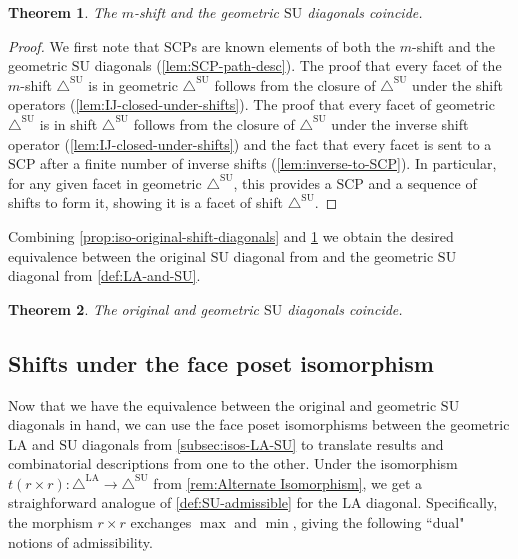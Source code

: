 \documentclass{amsart}
\newtheorem{theorem}{Theorem}[section]
\theoremstyle{definition}
\newcommand{\SU}{\mathrm{SU}}
\newcommand{\LA}{\mathrm{LA}}
\newcommand{\SUD}{\triangle^{\mathrm{SU}}}
\newcommand{\LAD}{\triangle^{\mathrm{LA}}}
\newcommand{\SCP}{\mathrm{SCP}}
\begin{document}
\begin{theorem} 
\label{prop:iso-shift-IJ-diagonals}
The $m$-shift and the geometric $\SU$ diagonals coincide.
\end{theorem}

\begin{proof}
We first note that $\SCP$s are known elements of both the $m$-shift and the geometric $\SU$ diagonals (\cref{lem:SCP-path-desc}).
The proof that every facet of the $m$-shift $\SUD$ is in geometric $\SUD$ follows from the closure of $\SUD$ under the shift operators (\cref{lem:IJ-closed-under-shifts}).
The proof that every facet of geometric $\SUD$ is in shift $\SUD$ follows from the closure of $\SUD$ under the inverse shift operator (\cref{lem:IJ-closed-under-shifts}) and the fact that every facet is sent to a $\SCP$ after a finite number of inverse shifts (\cref{lem:inverse-to-SCP}).
In particular, for any given facet in geometric $\SUD$, this provides a $\SCP$ and a sequence of shifts to form it, showing it is a facet of shift $\SUD$.
\end{proof}

Combining \cref{prop:iso-original-shift-diagonals} and \cref{prop:iso-shift-IJ-diagonals} we obtain the desired equivalence between the original $\SU$ diagonal from \cite{SaneblidzeUmble} and the geometric $\SU$ diagonal from \cref{def:LA-and-SU}.

\begin{theorem}
\label{thm:recover-SU}
The original and geometric $\SU$ diagonals coincide.
\end{theorem}


\subsection{Shifts under the face poset isomorphism}
\label{subsec:shifts-under-iso}

Now that we have the equivalence between the original and geometric $\SU$ diagonals in hand, we can use the face poset isomorphisms between the geometric $\LA$ and $\SU$ diagonals from \cref{subsec:isos-LA-SU} to translate results and combinatorial descriptions from one to the other. 
Under the isomorphism $t(r\times r):\LAD\to\SUD$ from \cref{rem:Alternate Isomorphism}, we get a straighforward analogue of \cref{def:SU-admissible} for the $\LA$ diagonal.
Specifically, the morphism $r \times r$ exchanges $\max$ and $\min$, giving the following ``dual" notions of admissibility.
\end{document}
